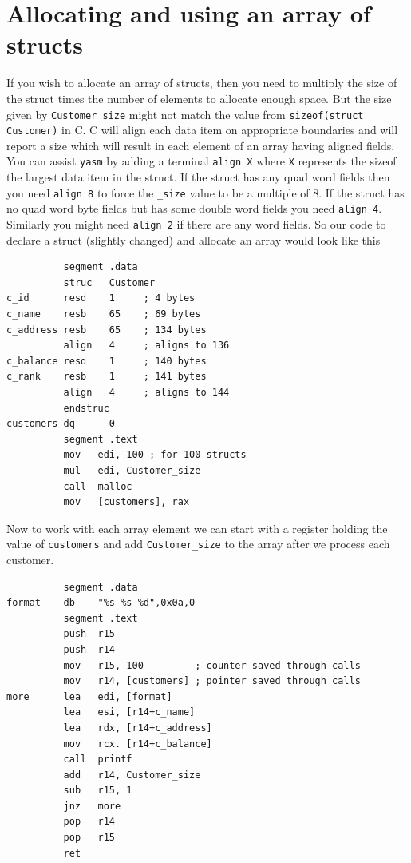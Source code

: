 \documentclass[11pt,b5paper]{book}
\begin{document}
\section{Allocating and using an array of structs}

If you wish to allocate an array of structs, then you need to multiply the size of the struct times
the number of elements to allocate enough space.
But the size given by {\tt Customer\_size} might not match the value from {\tt sizeof(struct Customer)}
in C.
C will align each data item on appropriate boundaries and will report a size which will result in
each element of an array having aligned fields.
You can assist {\tt yasm} by adding a terminal {\tt align X} where {\tt X} represents the sizeof the
largest data item in the struct.
If the struct has any quad word fields then you need {\tt align 8} to force the {\tt \_size} value to be a
multiple of 8.
If the struct has no quad word byte fields but has some double word fields you need {\tt align 4}.
Similarly you might need {\tt align 2} if there are any word fields.
So our code to declare a struct (slightly changed) and allocate an array would look like this
\begin{verbatim}
          segment .data
          struc   Customer
c_id      resd    1     ; 4 bytes
c_name    resb    65    ; 69 bytes
c_address resb    65    ; 134 bytes
          align   4     ; aligns to 136
c_balance resd    1     ; 140 bytes
c_rank    resb    1     ; 141 bytes
          align   4     ; aligns to 144
          endstruc
customers dq      0
          segment .text
          mov   edi, 100 ; for 100 structs
          mul   edi, Customer_size 
          call  malloc
          mov   [customers], rax
\end{verbatim}

Now to work with each array element we can start with a register holding the value of
{\tt customers} and add {\tt Customer\_size} to the array after we process each customer.
\begin{verbatim}
          segment .data
format    db    "%s %s %d",0x0a,0
          segment .text
          push  r15
          push  r14
          mov   r15, 100         ; counter saved through calls
          mov   r14, [customers] ; pointer saved through calls
more      lea   edi, [format]
          lea   esi, [r14+c_name]
          lea   rdx, [r14+c_address]
          mov   rcx. [r14+c_balance]
          call  printf
          add   r14, Customer_size
          sub   r15, 1
          jnz   more
          pop   r14
          pop   r15
          ret
\end{verbatim}
\end{document}
